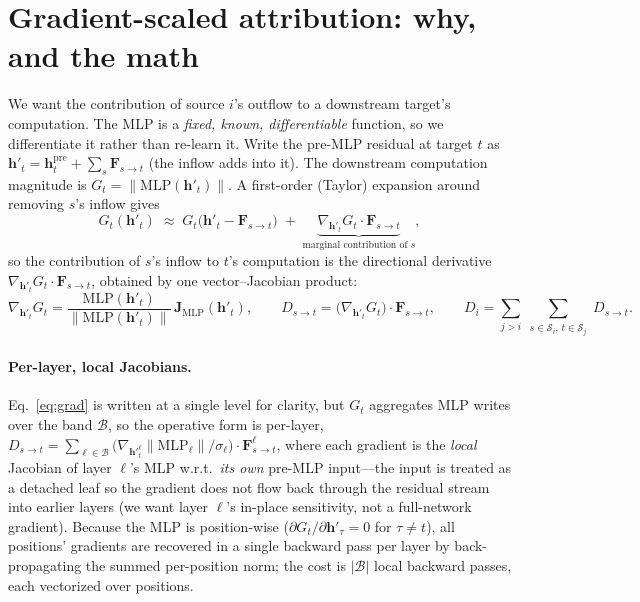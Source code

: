 \documentclass[11pt]{article}
\newcommand{\F}{\mathbf{F}}
\newcommand{\hh}{\mathbf{h}}
\newcommand{\Jac}{\mathbf{J}}
\newcommand{\norm}[1]{\left\lVert #1 \right\rVert}
\newcommand{\MLP}{\mathrm{MLP}}
\newcommand{\Span}{\mathcal S}
\begin{document}
\section{Gradient-scaled attribution: why, and the math}
\label{sec:gradmath}
We want the contribution of source $i$'s outflow to a downstream target's computation. The MLP is a
\emph{fixed, known, differentiable} function, so we differentiate it rather than re-learn it. Write
the pre-MLP residual at target $t$ as $\hh'_t=\hh^{\text{pre}}_t+\sum_{s}\F_{s\to t}$ (the inflow adds
into it). The downstream computation magnitude is $G_t=\norm{\MLP(\hh'_t)}$. A first-order (Taylor)
expansion around removing $s$'s inflow gives
\begin{equation}
G_t(\hh'_t)\;\approx\;G_t\!\big(\hh'_t-\F_{s\to t}\big)\;+\;\underbrace{\nabla_{\hh'_t}G_t\cdot\F_{s\to t}}_{\text{marginal contribution of }s},
\label{eq:taylor}
\end{equation}
so the contribution of $s$'s inflow to $t$'s computation is the directional derivative
$\nabla_{\hh'_t}G_t\cdot\F_{s\to t}$, obtained by one vector--Jacobian product:
\begin{equation}
\nabla_{\hh'_t}G_t=\frac{\MLP(\hh'_t)}{\norm{\MLP(\hh'_t)}}\,\Jac_{\MLP}(\hh'_t),
\qquad
D_{s\to t}=\big(\nabla_{\hh'_t}G_t\big)\cdot\F_{s\to t},
\qquad
D_i=\sum_{j>i}\sum_{\substack{s\in\Span_i,\,t\in\Span_j}}D_{s\to t}.
\label{eq:grad}
\end{equation}

\paragraph{Per-layer, local Jacobians.} Eq.~\eqref{eq:grad} is written at a single level for clarity,
but $G_t$ aggregates MLP writes over the band $\mathcal B$, so the operative form is per-layer,
$D_{s\to t}=\sum_{\ell\in\mathcal B}\big(\nabla_{\hh'^{\ell}_t}\norm{\MLP_\ell}/\sigma_\ell\big)\cdot\F^{\ell}_{s\to t}$,
where each gradient is the \emph{local} Jacobian of layer $\ell$'s MLP w.r.t.\ \emph{its own} pre-MLP
input---the input is treated as a detached leaf so the gradient does not flow back through the residual
stream into earlier layers (we want layer $\ell$'s in-place sensitivity, not a full-network gradient).
Because the MLP is position-wise ($\partial G_t/\partial \hh'_\tau=0$ for $\tau\neq t$), all positions'
gradients are recovered in a single backward pass per layer by back-propagating the summed per-position
norm; the cost is $|\mathcal B|$ local backward passes, each vectorized over positions.
\end{document}
